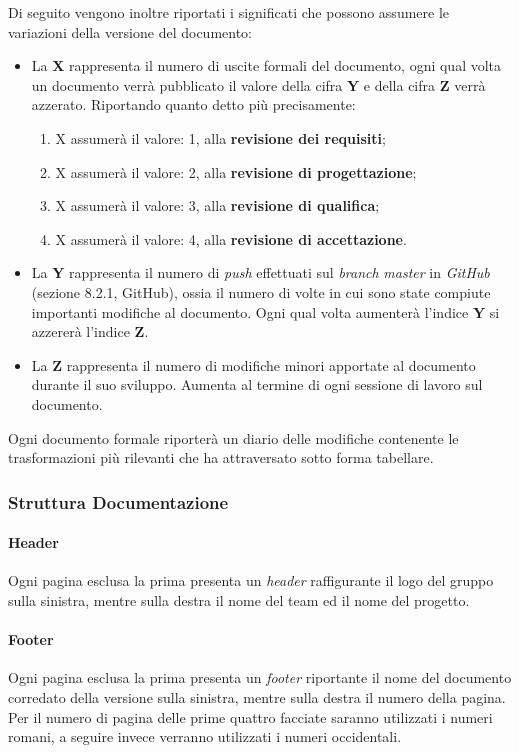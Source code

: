 Di seguito vengono inoltre riportati i significati che possono assumere le variazioni della versione del documento:
\begin{itemize}
\item La \textbf{X} rappresenta il numero di uscite formali del documento, ogni qual volta un documento verrà pubblicato il valore della cifra \textbf{Y} e della cifra \textbf{Z} verrà azzerato. Riportando quanto detto più precisamente:
\begin{enumerate}
\item X assumerà il valore: 1, alla \textbf{revisione dei requisiti};
\item X assumerà il valore: 2, alla \textbf{revisione di progettazione};
\item X assumerà il valore: 3, alla \textbf{revisione di qualifica};
\item X assumerà il valore: 4, alla \textbf{revisione di accettazione}.
\end{enumerate}
\item La \textbf{Y} rappresenta il numero di \textit{push} effettuati sul \textit{branch} \textit{master} in \textit{GitHub} (sezione 8.2.1, GitHub), ossia il numero di volte in cui sono state compiute importanti modifiche al documento. Ogni qual volta aumenterà l'indice \textbf{Y} si azzererà l'indice \textbf{Z}.
\item La \textbf{Z} rappresenta il numero di modifiche minori apportate al documento durante il suo sviluppo.
Aumenta al termine di ogni sessione di lavoro sul documento.
\end{itemize}

Ogni documento formale riporterà un diario delle modifiche contenente le trasformazioni più rilevanti che ha attraversato sotto forma tabellare.

\subsubsection{Struttura Documentazione}
\paragraph{Header}
Ogni pagina esclusa la prima presenta un \textit{header} raffigurante il logo del gruppo sulla sinistra, mentre sulla destra il nome del team ed il nome del progetto.
\paragraph{Footer}
Ogni pagina esclusa la prima presenta un \textit{footer} riportante il nome del documento corredato della versione sulla sinistra, mentre sulla destra il numero della pagina.
Per il numero di pagina delle prime quattro facciate saranno utilizzati i numeri romani, a seguire invece verranno utilizzati i numeri occidentali.
